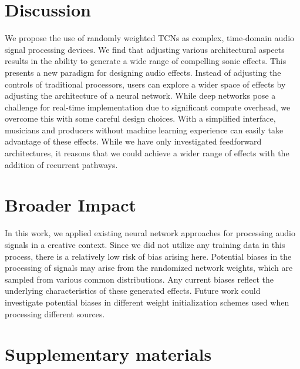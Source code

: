 \documentclass{article}
\begin{document}
\section{Discussion}

We propose the use of randomly weighted TCNs as complex, time-domain audio signal processing devices. 
We find that adjusting various architectural aspects results in the ability to generate a wide range of compelling sonic effects.
This presents a new paradigm for designing audio effects. 
Instead of adjusting the controls of traditional processors, users can explore a wider space of effects by adjusting the architecture of a neural network.
While deep networks pose a challenge for real-time implementation due to significant compute overhead, 
we overcome this with some careful design choices. 
With a simplified interface, musicians and producers without machine learning experience can easily take advantage of these effects.
While we have only investigated feedforward architectures, 
it reasons that we could achieve a wider range of effects with the addition of recurrent pathways.

\section*{Broader Impact}
In this work, we applied existing neural network approaches for processing audio signals in a creative context.
Since we did not utilize any training data in this process, there is a relatively low risk of bias arising here. 
Potential biases in the processing of signals may arise from the randomized network weights,
which are sampled from various common distributions. 
Any current biases reflect the underlying characteristics of these generated effects. 
Future work could investigate potential biases in different weight initialization schemes used when processing different sources. 

  


\newpage
\section*{Supplementary materials}
\end{document}

